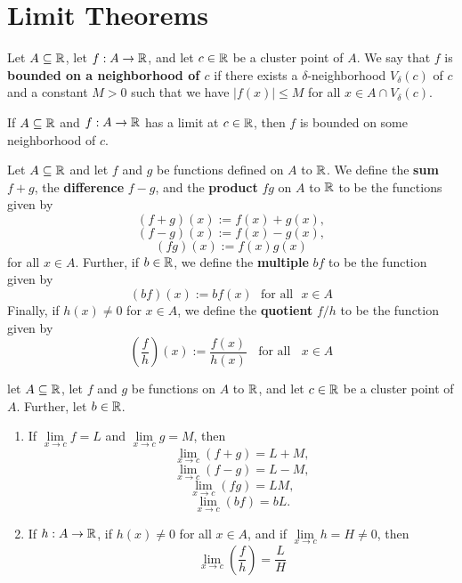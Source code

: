 \section{Limit Theorems}

\begin{definition}
	Let $A \subseteq \mathbb{R}$, let $f:A \rightarrow \mathbb{R}$, and let $c \in \mathbb{R}$ be a cluster point of $A$. We say that $f$ is \textbf{bounded on a neighborhood of $c$} if there exists a $\delta$-neighborhood $V_\delta(c)$ of $c$ and a constant $M > 0$ such that we have $|f(x)| \leq M$ for all $x \in A \cap V_\delta (c)$.
\end{definition}

\begin{theorem}
	If $A \subseteq \mathbb{R}$ and $f:A \rightarrow \mathbb{R}$ has a limit at $c \in \mathbb{R}$, then $f$ is bounded on some neighborhood of $c$.
\end{theorem}

\begin{theorem}
	Let $A \subseteq \mathbb{R}$ and let $f$ and $g$ be functions defined on $A$ to $\mathbb{R}$. We  define the \textbf{sum} $f+g$, the \textbf{difference} $f-g$, and the \textbf{product} $fg$ on $A$ to $\mathbb{R}$ to be the functions given by
	\[(f+g)(x):=f(x)+g(x),\]
	\[(f-g)(x):=f(x)-g(x),\]
	\[(fg)(x):=f(x)g(x)\]
	for all $x \in A$. Further, if $b \in \mathbb{R}$, we define the \textbf{multiple} $bf$ to be the function given by
	\[(bf)(x) := bf(x)\ \ \ \text{for all}\ \ \ x \in A\]
	Finally, if $h(x)\neq 0$ for $x \in A$, we define the \textbf{quotient} $f/h$ to be the function given by
	\[\left( \frac{f}{h}\right)(x) := \frac{f(x)}{h(x)}\ \ \ \ \text{for all}\ \ \ \ x \in A\]
\end{theorem}

\begin{theorem}
	let $A \subseteq \mathbb{R}$, let $f$ and $g$ be functions on $A$ to $\mathbb{R}$, and let $c \in \mathbb{R}$ be a cluster point of $A$. Further, let $b \in \mathbb{R}$.
	\begin{enumerate}
		\item If $\lim\limits_{x\to c} f = L$ and $\lim\limits_{x\to c} g = M$, then
		      \[\lim\limits_{x\to c} (f+g) = L+M,\]
		      \[\lim\limits_{x\to c} (f-g)=L-M,\]
		      \[\lim\limits_{x\to c} (fg) = LM,\]
		      \[\lim\limits_{x\to c} (bf) = bL.\]

		\item If $h: A \rightarrow \mathbb{R}$, if $h(x) \neq 0$ for all $x \in A$, and if $\lim\limits_{x\to c} h = H \neq 0$, then
		      \[\lim\limits_{x\to c} \left( \frac{f}{h} \right)= \frac{L}{H}\]
	\end{enumerate}
\end{theorem}

